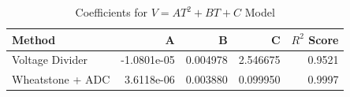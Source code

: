 \begin{table}[H]
\centering
\caption{Coefficients for $V = AT^2 + BT + C$ Model}
\label{table:lsq_coefficients_table}
\begin{tabular}{lrrrr}
\toprule
 Method & A & B & C & $R^2$ Score \\
\midrule
 Voltage Divider & -1.0801e-05 & 0.004978 & 2.546675 & 0.9521 \\
 Wheatstone + ADC & 3.6118e-06 & 0.003880 & 0.099950 & 0.9997 \\
\bottomrule
\end{tabular}
\end{table}
